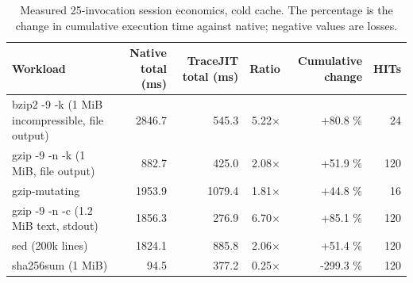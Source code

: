 \begin{table}[t]
\centering
\small
\caption{Measured 25-invocation session economics, cold cache. The percentage is the change in cumulative execution time against native; negative values are losses.}
\label{tab:session_economics}
\begin{tabular}{lrrrrr}
\toprule
\textbf{Workload} & \textbf{Native total (ms)} & \textbf{TraceJIT total (ms)} & \textbf{Ratio} & \textbf{Cumulative change} & \textbf{HITs} \\
\midrule
bzip2 -9 -k (1 MiB incompressible, file output) & 2846.7 & 545.3 & 5.22× & +80.8 \% & 24 \\
gzip -9 -n -k (1 MiB, file output) & 882.7 & 425.0 & 2.08× & +51.9 \% & 120 \\
gzip-mutating & 1953.9 & 1079.4 & 1.81× & +44.8 \% & 16 \\
gzip -9 -n -c (1.2 MiB text, stdout) & 1856.3 & 276.9 & 6.70× & +85.1 \% & 120 \\
sed (200k lines) & 1824.1 & 885.8 & 2.06× & +51.4 \% & 120 \\
sha256sum (1 MiB) & 94.5 & 377.2 & 0.25× & -299.3 \% & 120 \\
\bottomrule
\end{tabular}
\end{table}
